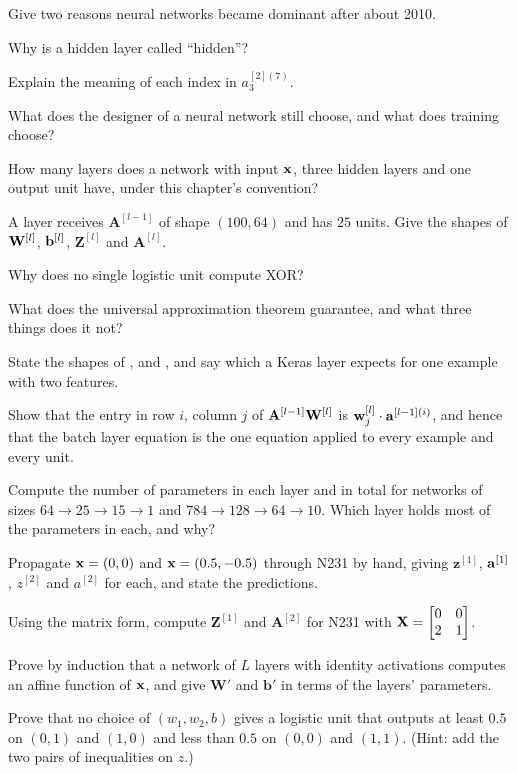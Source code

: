 \sq Give two reasons neural networks became dominant after about 2010.

\sq Why is a hidden layer called ``hidden''?

\sq Explain the meaning of each index in $a^{[2](7)}_3$.

\sq What does the designer of a neural network still choose, and what does
training choose?

\sq How many layers does a network with input $\mathbf{x}$, three hidden layers and one
output unit have, under this chapter's convention?

\sq A layer receives $\mathbf{A}^{[l-1]}$ of shape $(100, 64)$ and has $25$
units. Give the shapes of $\mathbf{W}^{[l]}$, $\mathbf{b}^{[l]}$, $\mathbf{Z}^{[l]}$ and
$\mathbf{A}^{[l]}$.

\sq Why does no single logistic unit compute XOR?

\sq What does the universal approximation theorem guarantee, and what three
things does it not?

\sq State the shapes of ,  and
, and say which a Keras layer expects for one example
with two features.


\ap Show that the entry in row $i$, column $j$ of $\mathbf{A}^{[l-1]}\mathbf{W}^{[l]}$ is
$\mathbf{w}^{[l]}_j\cdot\mathbf{a}^{[l-1](i)}$, and hence that the batch layer equation is the
one equation applied to every example and every unit.

\ap Compute the number of parameters in each layer and in total for networks of
sizes $64\to25\to15\to1$ and $784\to128\to64\to10$. Which layer holds most of
the parameters in each, and why?

\ap Propagate $\mathbf{x} = (0, 0)$ and $\mathbf{x} = (0.5, -0.5)$ through N231 by hand,
giving $\mathbf{z}^{[1]}$, $\mathbf{a}^{[1]}$, $z^{[2]}$ and $a^{[2]}$ for each, and
state the predictions.

\ap Using the matrix form, compute $\mathbf{Z}^{[1]}$ and $\mathbf{A}^{[2]}$ for
N231 with $\mathbf{X} = \begin{bmatrix}0&0\\2&1\end{bmatrix}$.

\ap Prove by induction that a network of $L$ layers with identity activations
computes an affine function of $\mathbf{x}$, and give $\mathbf{W}'$ and $\mathbf{b}'$
in terms of the layers' parameters.

\ap Prove that no choice of $(w_1, w_2, b)$ gives a logistic unit that outputs
at least $0.5$ on $(0,1)$ and $(1,0)$ and less than $0.5$ on $(0,0)$ and $(1,1)$.
(Hint: add the two pairs of inequalities on $z$.)

